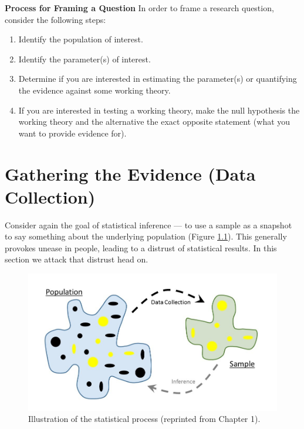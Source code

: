 \documentclass[
]{book}
\providecommand{\tightlist}{%
  \setlength{\itemsep}{0pt}\setlength{\parskip}{0pt}}
\theoremstyle{plain}
\theoremstyle{mydefn}
\theoremstyle{myexmpl}
\theoremstyle{remark}
\begin{document}
\begin{rmdtip}
\textbf{Process for Framing a Question} In order to frame a research question, consider the following steps:

\begin{enumerate}
\def\labelenumi{\arabic{enumi}.}
\tightlist
\item
  Identify the population of interest.
\item
  Identify the parameter(s) of interest.
\item
  Determine if you are interested in estimating the parameter(s) or quantifying the evidence against some working theory.
\item
  If you are interested in testing a working theory, make the null hypothesis the working theory and the alternative the exact opposite statement (what you want to provide evidence for).
\end{enumerate}
\end{rmdtip}

\hypertarget{Data}{%
\chapter{Gathering the Evidence (Data Collection)}\label{Data}}

Consider again the goal of statistical inference --- to use a sample as a snapshot to say something about the underlying population (Figure \ref{fig:data-statistical-process}). This generally provokes unease in people, leading to a distrust of statistical results. In this section we attack that distrust head on.

\begin{figure}

{\centering \includegraphics[width=0.8\linewidth]{images/Basics-Stat-Process} 

}

\caption{Illustration of the statistical process (reprinted from Chapter 1).}\label{fig:data-statistical-process}
\end{figure}
\end{document}
